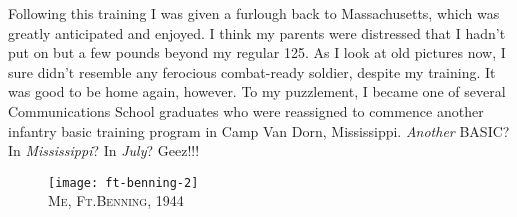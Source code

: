 \documentclass[../m3y]{subfiles}
\begin{document}
Following this training I was given a furlough back to Massachusetts, which was greatly anticipated and enjoyed. I think my parents were distressed that I hadn't put on but a few pounds beyond my regular 125. As I look at old pictures now, I sure didn't resemble any ferocious combat-ready soldier, despite my training. It was good to be home again, however. To my puzzlement, I became one of several Communications School graduates who were reassigned to commence another infantry basic training program in Camp Van Dorn, Mississippi. \emph{Another} BASIC? In \emph{Mississippi}? In \emph{July}? Geez!!!

\begin{figure}[h]
\centering
\texttt{[image: ft-benning-2]}\\
\medskip
{\newtimes\textsc{Me, Ft.\thinspace{}Benning, 1944}}
\end{figure}
\end{document}
